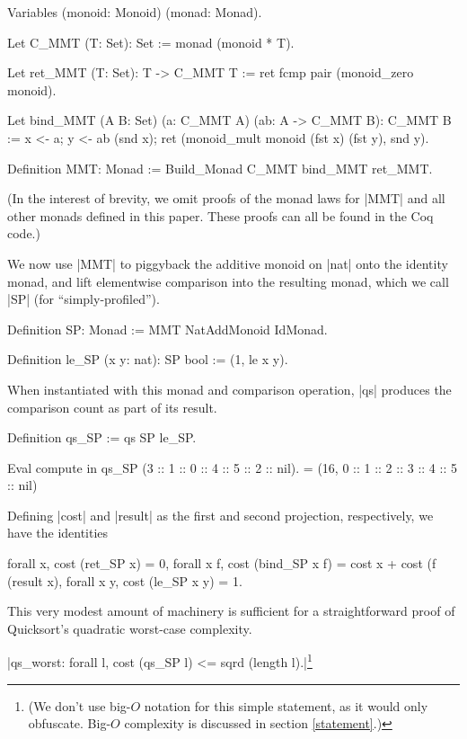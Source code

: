 \documentclass[runningheads]{llncs}
\begin{document}
\begin{code}
  Variables (monoid: Monoid) (monad: Monad).

  Let C_MMT (T: Set): Set := monad (monoid * T).

  Let ret_MMT (T: Set): T -> C_MMT T := ret fcmp pair (monoid_zero monoid).

  Let bind_MMT (A B: Set) (a: C_MMT A) (ab: A -> C_MMT B): C_MMT B :=
    x <- a; y <- ab (snd x); ret (monoid_mult monoid (fst x) (fst y), snd y).

  Definition MMT: Monad := Build_Monad C_MMT bind_MMT ret_MMT.
\end{code}
(In the interest of brevity, we omit proofs of the monad laws for |MMT| and all other monads defined in this paper. These proofs can all be found in the Coq code.)

We now use |MMT| to piggyback the additive monoid on |nat| onto the identity monad, and lift elementwise comparison into the resulting monad, which we call |SP| (for ``simply-profiled'').
\begin{code}
  Definition SP: Monad := MMT NatAddMonoid IdMonad.

  Definition le_SP (x y: nat): SP bool := (1, le x y).
\end{code}
When instantiated with this monad and comparison operation, |qs| produces the comparison count as part of its result.
\begin{code}
  Definition qs_SP := qs SP le_SP.

  Eval compute in qs_SP (3 :: 1 :: 0 :: 4 :: 5 :: 2 :: nil).
    = (16, 0 :: 1 :: 2 :: 3 :: 4 :: 5 :: nil)
\end{code}
Defining |cost| and |result| as the first and second projection, respectively, we have the identities
\begin{code}
  forall x, cost (ret_SP x) = 0,
  forall x f, cost (bind_SP x f) = cost x + cost (f (result x),
  forall x y, cost (le_SP x y) = 1.
\end{code}
This very modest amount of machinery is sufficient for a straightforward proof of Quicksort's quadratic worst-case complexity.

\begin{propo}|qs_worst: forall l, cost (qs_SP l) <= sqrd (length l).|\footnote{(We don't use big-$O$ notation for this simple statement, as it would only obfuscate. Big-$O$ complexity is discussed in section \ref{statement}.)}
\end{propo}
\end{document}
